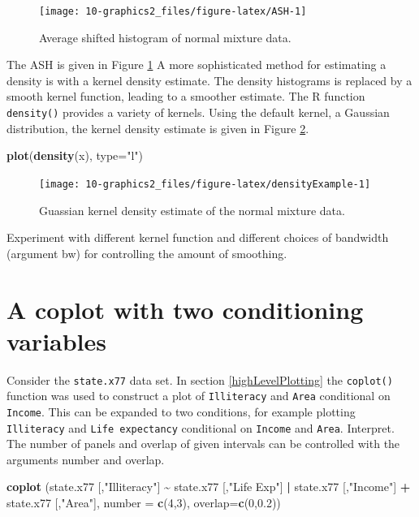 \documentclass[
]{book}
\newenvironment{Shaded}{\begin{snugshade}}{\end{snugshade}}
\newcommand{\AttributeTok}[1]{\textcolor[rgb]{0.13,0.29,0.53}{#1}}
\newcommand{\DecValTok}[1]{\textcolor[rgb]{0.00,0.00,0.81}{#1}}
\newcommand{\FloatTok}[1]{\textcolor[rgb]{0.00,0.00,0.81}{#1}}
\newcommand{\FunctionTok}[1]{\textcolor[rgb]{0.13,0.29,0.53}{\textbf{#1}}}
\newcommand{\NormalTok}[1]{#1}
\newcommand{\SpecialCharTok}[1]{\textcolor[rgb]{0.81,0.36,0.00}{\textbf{#1}}}
\newcommand{\StringTok}[1]{\textcolor[rgb]{0.31,0.60,0.02}{#1}}
\begin{document}
\begin{figure}
\texttt{[image: 10-graphics2\_files/figure-latex/ASH-1]} \caption{Average shifted histogram of normal mixture data.}\label{fig:ASH}
\end{figure}

The ASH is given in Figure \ref{fig:ASH} A more sophisticated method for estimating a density is with a kernel density estimate. The density histograms is replaced by a smooth kernel function, leading to a smoother estimate. The R function \texttt{density()} provides a variety of kernels. Using the default kernel, a Gaussian distribution, the kernel density estimate is given in Figure \ref{fig:densityExample}.

\begin{Shaded}
\begin{Highlighting}[]
\FunctionTok{plot}\NormalTok{(}\FunctionTok{density}\NormalTok{(x), }\AttributeTok{type=}\StringTok{"l"}\NormalTok{)}
\end{Highlighting}
\end{Shaded}

\begin{figure}
\texttt{[image: 10-graphics2\_files/figure-latex/densityExample-1]} \caption{Guassian kernel density estimate of the normal mixture data.}\label{fig:densityExample}
\end{figure}

Experiment with different kernel function and different choices of bandwidth (argument bw) for controlling the amount of smoothing.

\section{A coplot with two conditioning variables}\label{a-coplot-with-two-conditioning-variables}

Consider the \texttt{state.x77} data set. In section \ref{highLevelPlotting} the \texttt{coplot()} function was used to construct a plot of \texttt{Illiteracy} and \texttt{Area} conditional on \texttt{Income}. This can be expanded to two conditions, for example plotting \texttt{Illiteracy} and \texttt{Life\ expectancy} conditional on \texttt{Income} and \texttt{Area}. Interpret. The number of panels and overlap of given intervals can be controlled with the arguments number and overlap.

\begin{Shaded}
\begin{Highlighting}[]
\FunctionTok{coplot}\NormalTok{ (state.x77 [,}\StringTok{"Illiteracy"}\NormalTok{] }\SpecialCharTok{\textasciitilde{}}\NormalTok{ state.x77 [,}\StringTok{"Life Exp"}\NormalTok{] }\SpecialCharTok{|} 
\NormalTok{                                   state.x77 [,}\StringTok{"Income"}\NormalTok{] }\SpecialCharTok{+}\NormalTok{ state.x77 [,}\StringTok{"Area"}\NormalTok{], }
                                \AttributeTok{number =} \FunctionTok{c}\NormalTok{(}\DecValTok{4}\NormalTok{,}\DecValTok{3}\NormalTok{), }\AttributeTok{overlap=}\FunctionTok{c}\NormalTok{(}\DecValTok{0}\NormalTok{,}\FloatTok{0.2}\NormalTok{))}
\end{Highlighting}
\end{Shaded}
\end{document}
